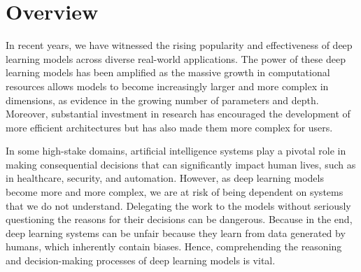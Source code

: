 \section{Overview}

In recent years, we have witnessed the rising popularity and effectiveness of deep learning models across diverse real-world applications. The power of these deep learning models has been amplified as the massive growth in computational resources allows models to become increasingly larger and more complex in dimensions, as evidence in the growing number of parameters and depth. Moreover, substantial investment in research has encouraged the development of more efficient architectures but has also made them more complex for users.


In some high-stake domains, artificial intelligence systems play a pivotal role in making consequential decisions that can significantly impact human lives, such as in healthcare, security, and automation. However, as deep learning models become more and more complex, we are at risk of being dependent on systems that we do not understand. Delegating the work to the models without seriously questioning the reasons for their decisions can be dangerous. Because in the end, deep learning systems can be unfair because they learn from data generated by humans, which inherently contain biases. Hence, comprehending the reasoning and decision-making processes of deep learning models is vital.


